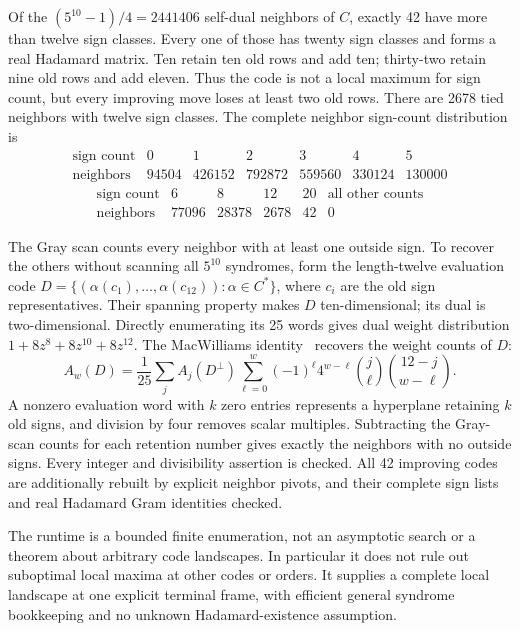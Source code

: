 \begin{theorem}
Of the $(5^{10}-1)/4=2441406$ self-dual neighbors of $C$, exactly
42 have more than twelve sign classes. Every one of those has
twenty sign classes and forms a real Hadamard matrix. Ten retain
ten old rows and add ten; thirty-two retain nine old rows and add
eleven. Thus the code is not a local maximum for sign count, but
every improving move loses at least two old rows.
There are 2678 tied neighbors with twelve sign classes.
The complete neighbor sign-count distribution is
\[
\begin{array}{c|rrrrrr}
\text{sign count}&0&1&2&3&4&5\\\hline
\text{neighbors}&94504&426152&792872&559560&330124&130000
\end{array}
\]
\[
\begin{array}{c|rrrrr}
\text{sign count}&6&8&12&20&\text{all other counts}\\\hline
\text{neighbors}&77096&28378&2678&42&0
\end{array}
\]
\end{theorem}

The Gray scan counts every neighbor with at least one outside sign.
To recover the others without scanning all $5^{10}$ syndromes, form
the length-twelve evaluation code
$D=\{(\alpha(c_1),\ldots,\alpha(c_{12})): \alpha\in C^*\}$,
where $c_i$ are the old sign representatives. Their spanning property
makes $D$ ten-dimensional; its dual is two-dimensional. Directly
enumerating its 25 words gives dual weight distribution
$1+8z^8+8z^{10}+8z^{12}$.
The MacWilliams identity~\cite{MW} recovers the weight counts of $D$:
\[
 A_w(D)=\frac1{25}\sum_j A_j(D^\perp)
 \sum_{\ell=0}^w(-1)^\ell4^{w-\ell}
       \binom j\ell\binom{12-j}{w-\ell}.
\]
A nonzero evaluation word with $k$ zero entries represents a
hyperplane retaining $k$ old signs, and division by four removes
scalar multiples. Subtracting the Gray-scan counts for each retention
number gives exactly the neighbors with no outside signs. Every
integer and divisibility assertion is checked. All 42 improving
codes are additionally rebuilt by explicit neighbor pivots, and
their complete sign lists and real Hadamard Gram identities checked.

The runtime is a bounded finite enumeration, not an asymptotic search
or a theorem about arbitrary code landscapes. In particular it does
not rule out suboptimal local maxima at other codes or orders.
It supplies a complete local landscape at one explicit terminal
frame, with efficient general syndrome bookkeeping and no unknown
Hadamard-existence assumption.

